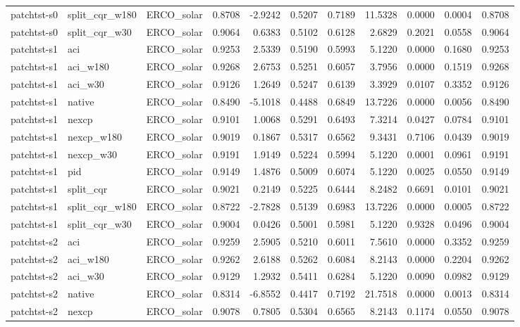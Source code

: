 \begin{tabular}{lllrrrrrrrr}
patchtst-s0 & split_cqr_w180 & ERCO_solar & 0.8708 & -2.9242 & 0.5207 & 0.7189 & 11.5328 & 0.0000 & 0.0004 & 0.8708 \\
patchtst-s0 & split_cqr_w30 & ERCO_solar & 0.9064 & 0.6383 & 0.5102 & 0.6128 & 2.6829 & 0.2021 & 0.0558 & 0.9064 \\
patchtst-s1 & aci & ERCO_solar & 0.9253 & 2.5339 & 0.5190 & 0.5993 & 5.1220 & 0.0000 & 0.1680 & 0.9253 \\
patchtst-s1 & aci_w180 & ERCO_solar & 0.9268 & 2.6753 & 0.5251 & 0.6057 & 3.7956 & 0.0000 & 0.1519 & 0.9268 \\
patchtst-s1 & aci_w30 & ERCO_solar & 0.9126 & 1.2649 & 0.5247 & 0.6139 & 3.3929 & 0.0107 & 0.3352 & 0.9126 \\
patchtst-s1 & native & ERCO_solar & 0.8490 & -5.1018 & 0.4488 & 0.6849 & 13.7226 & 0.0000 & 0.0056 & 0.8490 \\
patchtst-s1 & nexcp & ERCO_solar & 0.9101 & 1.0068 & 0.5291 & 0.6493 & 7.3214 & 0.0427 & 0.0784 & 0.9101 \\
patchtst-s1 & nexcp_w180 & ERCO_solar & 0.9019 & 0.1867 & 0.5317 & 0.6562 & 9.3431 & 0.7106 & 0.0439 & 0.9019 \\
patchtst-s1 & nexcp_w30 & ERCO_solar & 0.9191 & 1.9149 & 0.5224 & 0.5994 & 5.1220 & 0.0001 & 0.0961 & 0.9191 \\
patchtst-s1 & pid & ERCO_solar & 0.9149 & 1.4876 & 0.5009 & 0.6074 & 5.1220 & 0.0025 & 0.0550 & 0.9149 \\
patchtst-s1 & split_cqr & ERCO_solar & 0.9021 & 0.2149 & 0.5225 & 0.6444 & 8.2482 & 0.6691 & 0.0101 & 0.9021 \\
patchtst-s1 & split_cqr_w180 & ERCO_solar & 0.8722 & -2.7828 & 0.5139 & 0.6983 & 13.7226 & 0.0000 & 0.0005 & 0.8722 \\
patchtst-s1 & split_cqr_w30 & ERCO_solar & 0.9004 & 0.0426 & 0.5001 & 0.5981 & 5.1220 & 0.9328 & 0.0496 & 0.9004 \\
patchtst-s2 & aci & ERCO_solar & 0.9259 & 2.5905 & 0.5210 & 0.6011 & 7.5610 & 0.0000 & 0.3352 & 0.9259 \\
patchtst-s2 & aci_w180 & ERCO_solar & 0.9262 & 2.6188 & 0.5262 & 0.6084 & 8.2143 & 0.0000 & 0.2204 & 0.9262 \\
patchtst-s2 & aci_w30 & ERCO_solar & 0.9129 & 1.2932 & 0.5411 & 0.6284 & 5.1220 & 0.0090 & 0.0982 & 0.9129 \\
patchtst-s2 & native & ERCO_solar & 0.8314 & -6.8552 & 0.4417 & 0.7192 & 21.7518 & 0.0000 & 0.0013 & 0.8314 \\
patchtst-s2 & nexcp & ERCO_solar & 0.9078 & 0.7805 & 0.5304 & 0.6565 & 8.2143 & 0.1174 & 0.0550 & 0.9078 \\

\end{tabular}
